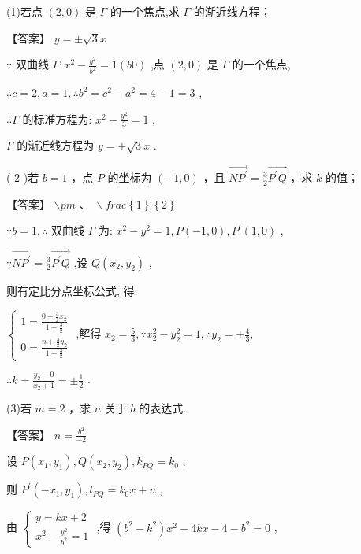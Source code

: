 \documentclass[10pt]{article}
\begin{document}
(1)若点 \(\left( {2,0}\right)\) 是 \(\Gamma\) 的一个焦点,求 \(\Gamma\) 的渐近线方程；

【答案】 \(y =  \pm  \sqrt{3}x\)

\(\because\) 双曲线 \(\Gamma  : {x}^{2} - \frac{{y}^{2}}{{b}^{2}} = 1\left( {b0}\right)\) ,点 \(\left( {2,0}\right)\) 是 \(\Gamma\) 的一个焦点,

\(\therefore c = 2,a = 1,\therefore {b}^{2} = {c}^{2} - {a}^{2} = 4 - 1 = 3\) ,

\(\therefore \Gamma\) 的标准方程为: \({x}^{2} - \frac{{y}^{2}}{3} = 1\) ,

\(\Gamma\) 的渐近线方程为 \(y =  \pm  \sqrt{3}x\) .

( 2 )若 \(b = 1\) ，点 \(P\) 的坐标为 \(\left( {-1,0}\right)\) ，且 \(\overrightarrow{N{P}^{\prime }} = \frac{3}{2}\overrightarrow{{P}^{\prime }Q}\) ，求 \(k\) 的值；

【答案】 \(\backslash  {pm}\text{ 、 } \backslash  {frac}\left\{  1\right\}  \left\{  2\right\}\)

\(\because b = 1,\therefore\) 双曲线 \(\Gamma\) 为: \({x}^{2} - {y}^{2} = 1,P\left( {-1,0}\right) ,{P}^{\prime }\left( {1,0}\right)\) ,

\(\because \overrightarrow{N{P}^{\prime }} = \frac{3}{2}\overrightarrow{{P}^{\prime }Q}\) ,设 \(Q\left( {{x}_{2},{y}_{2}}\right)\) ,

则有定比分点坐标公式, 得:

\(\left\{  {\begin{array}{l} 1 = \frac{0 + \frac{3}{2}{x}_{2}}{1 + \frac{3}{2}} \\  0 = \frac{n + \frac{3}{2}{y}_{2}}{1 + \frac{3}{2}} \end{array}\text{ ,解得 }{x}_{2} = \frac{5}{3},\because {x}_{2}^{2} - {y}_{2}^{2} = 1,\therefore {y}_{2} =  \pm  \frac{4}{3},}\right.\)

\(\therefore k = \frac{{y}_{2} - 0}{{x}_{2} + 1} =  \pm  \frac{1}{2}\) .

(3)若 \(m = 2\) ，求 \(n\) 关于 \(b\) 的表达式.

【答案】 \(n = \frac{{b}^{2}}{-2}\)

设 \(P\left( {{x}_{1},{y}_{1}}\right) ,Q\left( {{x}_{2},{y}_{2}}\right) ,{k}_{PQ} = {k}_{0}\) ,

则 \({P}^{\prime }\left( {-{x}_{1},{y}_{1}}\right) ,{l}_{PQ} = {k}_{0}x + n\) ,

由 \(\left\{  \begin{array}{l} y = {kx} + 2 \\  {x}^{2} - \frac{{y}^{2}}{{b}^{2}} = 1 \end{array}\right.\) ,得 \(\left( {{b}^{2} - {k}^{2}}\right) {x}^{2} - {4kx} - 4 - {b}^{2} = 0\) ,
\end{document}
